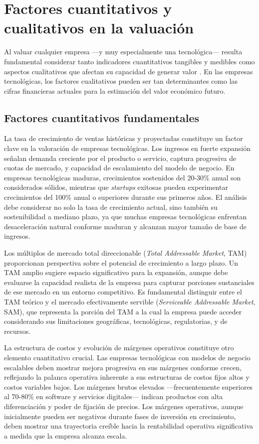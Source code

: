 \section{Factores cuantitativos y cualitativos en la valuación}

Al valuar cualquier empresa ---y muy especialmente una tecnológica--- resulta fundamental considerar tanto indicadores cuantitativos tangibles y medibles como aspectos cualitativos que afectan su capacidad de generar valor \citep{brinker2024}. En las empresas tecnológicas, los factores cualitativos pueden ser tan determinantes como las cifras financieras actuales para la estimación del valor económico futuro.

\subsection{Factores cuantitativos fundamentales}

La tasa de crecimiento de ventas históricas y proyectadas constituye un factor clave en la valoración de empresas tecnológicas. Los ingresos en fuerte expansión señalan demanda creciente por el producto o servicio, captura progresiva de cuotas de mercado, y capacidad de escalamiento del modelo de negocio. En empresas tecnológicas maduras, crecimientos sostenidos del 20-30\% anual son considerados sólidos, mientras que \emph{startups} exitosas pueden experimentar crecimientos del 100\% anual o superiores durante sus primeros años. El análisis debe considerar no solo la tasa de crecimiento actual, sino también su sostenibilidad a mediano plazo, ya que muchas empresas tecnológicas enfrentan desaceleración natural conforme maduran y alcanzan mayor tamaño de base de ingresos.

Los múltiplos de mercado total direccionable (\emph{Total Addressable Market}, TAM) proporcionan perspectiva sobre el potencial de crecimiento a largo plazo. Un TAM amplio sugiere espacio significativo para la expansión, aunque debe evaluarse la capacidad realista de la empresa para capturar porciones sustanciales de ese mercado en un entorno competitivo. Es fundamental distinguir entre el TAM teórico y el mercado efectivamente servible (\emph{Serviceable Addressable Market}, SAM), que representa la porción del TAM a la cual la empresa puede acceder considerando sus limitaciones geográficas, tecnológicas, regulatorias, y de recursos.

La estructura de costos y evolución de márgenes operativos constituye otro elemento cuantitativo crucial. Las empresas tecnológicas con modelos de negocio escalables deben mostrar mejora progresiva en sus márgenes conforme crecen, reflejando la palanca operativa inherente a sus estructuras de costos fijos altos y costos variables bajos. Los márgenes brutos elevados ---frecuentemente superiores al 70-80\% en software y servicios digitales--- indican productos con alta diferenciación y poder de fijación de precios. Los márgenes operativos, aunque inicialmente pueden ser negativos durante fases de inversión en crecimiento, deben mostrar una trayectoria creíble hacia la rentabilidad operativa significativa a medida que la empresa alcanza escala.

